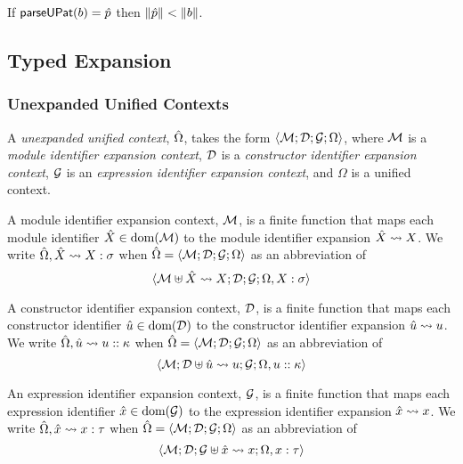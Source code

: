 \begin{condition}\label{condition:pattern-parsing-P} If $\mathsf{parseUPat}(b)=\hat{p}$ then $\Vert \hat{p} \Vert < \Vert b \Vert$.\end{condition}

\subsection{Typed Expansion}\label{appendix:typed-expansion-P}
\subsubsection{Unexpanded Unified Contexts}\label{appendix:u-unified-ctxs}
A \emph{unexpanded unified context}, ${\hat\Omega}$, takes the form $\langle \mathcal{M}; \mathcal{D}; \mathcal{G}; \Omega \rangle$, where $\mathcal{M}$ is a \emph{module identifier expansion context}, $\mathcal{D}$ is a \emph{constructor identifier expansion context}, $\mathcal{G}$ is an \emph{expression identifier expansion context}, and $\Omega$ is a unified context.

A module identifier expansion context, $\mathcal{M}$, is a finite function that maps each module identifier ${\hat X} \in \text{dom}(\mathcal{M})$ to the module identifier expansion ${\hat X} \leadsto X$. We write ${\hat\Omega}, {\hat X} \leadsto X : \sigma$ when ${\hat\Omega}=\langle \mathcal{M}; \mathcal{D}; \mathcal{G}; \Omega \rangle$ as an abbreviation of \[\langle \mathcal{M} \uplus {\hat X} \leadsto X; \mathcal{D}; \mathcal{G}; \Omega, X : \sigma \rangle\]

A constructor identifier expansion context, $\mathcal{D}$, is a finite function that maps each constructor identifier ${\hat u} \in \text{dom}(\mathcal{D})$ to the constructor identifier expansion ${\hat u} \leadsto u$. We write ${\hat\Omega}, {\hat u} \leadsto u :: \kappa$ when ${\hat\Omega}=\langle \mathcal{M}; \mathcal{D}; \mathcal{G}; \Omega \rangle$ as an abbreviation of \[\langle \mathcal{M}; \mathcal{D} \uplus {\hat u} \leadsto u; \mathcal{G}; \Omega, u :: \kappa \rangle\]

An expression identifier expansion context, $\mathcal{G}$, is a finite function that maps each expression identifier ${\hat x} \in \text{dom}(\mathcal{G})$ to the expression identifier expansion ${\hat x} \leadsto x$. We write ${\hat\Omega}, {\hat x} \leadsto x : \tau$ when ${\hat\Omega}=\langle \mathcal{M}; \mathcal{D}; \mathcal{G}; \Omega \rangle$ as an abbreviation of \[\langle \mathcal{M}; \mathcal{D}; \mathcal{G} \uplus {\hat x} \leadsto x; \Omega, x : \tau \rangle\]

